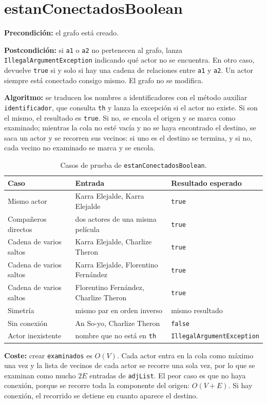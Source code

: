 \documentclass[a4paper,11pt]{report}
\newcommand{\coste}[1]{\par\noindent\textbf{Coste:} #1\par}
\newcommand{\espec}[2]{\par\noindent\textbf{Precondición:} #1\par\noindent\textbf{Postcondición:} #2\par}
\newcommand{\algoritmo}[1]{\par\noindent\textbf{Algoritmo:} #1\par}
\begin{document}
\section{\label{estanConectadosBoolean}estanConectadosBoolean}
\espec{el grafo está creado.}
{si \texttt{a1} o \texttt{a2} no pertenecen al grafo, lanza \texttt{IllegalArgumentException} indicando qué actor no se encuentra. En otro caso, devuelve \texttt{true} si y solo si hay una cadena de relaciones entre \texttt{a1} y \texttt{a2}. Un actor siempre está conectado consigo mismo. El grafo no se modifica.}
\algoritmo{se traducen los nombres a identificadores con el método auxiliar \texttt{identificador}, que consulta \texttt{th} y lanza la excepción si el actor no existe. Si son el mismo, el resultado es \texttt{true}. Si no, se encola el origen y se marca como examinado; mientras la cola no esté vacía y no se haya encontrado el destino, se saca un actor y se recorren sus vecinos: si uno es el destino se termina, y si no, cada vecino no examinado se marca y se encola.}


\begin{table}[ht]
\centering
\begin{tabular}{p{4.2cm} p{4.6cm} l}
\toprule
Caso & Entrada & Resultado esperado \\
\midrule
Mismo actor & Karra Elejalde, Karra Elejalde & \texttt{true} \\
Compañeros directos & dos actores de una misma película & \texttt{true} \\
Cadena de varios saltos & Karra Elejalde, Charlize Theron & \texttt{true} \\
Cadena de varios saltos & Karra Elejalde, Florentino Fernández & \texttt{true} \\
Cadena de varios saltos & Florentino Fernández, Charlize Theron & \texttt{true} \\
Simetría & mismo par en orden inverso & mismo resultado \\
Sin conexión & An So-yo, Charlize Theron & \texttt{false} \\
Actor inexistente & nombre que no está en \texttt{th} & \texttt{IllegalArgumentException} \\
\bottomrule
\end{tabular}
\caption{Casos de prueba de \texttt{estanConectadosBoolean}.}
\end{table}

\coste{crear \texttt{examinados} es $O(V)$. Cada actor entra en la cola como máximo una vez y la lista de vecinos de cada actor se recorre una sola vez, por lo que se examinan como mucho $2E$ entradas de \texttt{adjList}. El peor caso es que no haya conexión, porque se recorre toda la componente del origen: $O(V+E)$. Si hay conexión, el recorrido se detiene en cuanto aparece el destino.}
\end{document}
